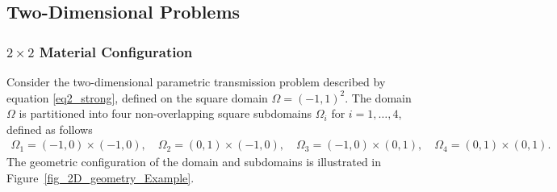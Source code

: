 \documentclass[oneside]{article}
\begin{document}
        




\subsection{Two-Dimensional Problems}\label{Two-Dimensional Problems}
\subsubsection{$2 \times 2$ Material Configuration}\label{2 by 2 Material Configuration}
Consider the two-dimensional parametric transmission problem described by equation \eqref{eq2_strong}, defined on the square domain \( \Omega = (-1, 1)^2 \). The domain \( \Omega \) is partitioned into four non-overlapping square subdomains \( \Omega_i \) for \( i = 1, \ldots, 4 \), defined as follows
\begin{align}
    \Omega_1 = (-1, 0) \times (-1, 0), \quad
    \Omega_2 = (0, 1) \times (-1, 0),\quad
    \Omega_3 = (-1, 0) \times (0, 1), \quad
    \Omega_4 = (0, 1) \times (0, 1).  
\end{align}
The geometric configuration of the domain and subdomains is illustrated in Figure~\ref{fig_2D_geometry_Example}. 
\end{document}
